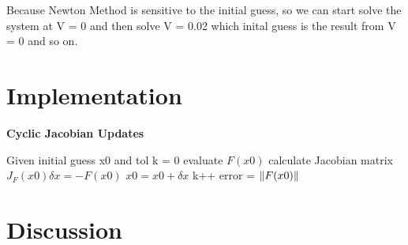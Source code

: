\documentclass{article}
\DeclarePairedDelimiter{\norm}{\lVert}{\rVert}
\begin{document}
Because Newton Method is sensitive to the initial guess, so we can start solve the system at V = 0 and then solve V = 0.02 which inital guess is
the result from V = 0 and so on.
\newpage

\section{Implementation}
\begin{algorithm}[H]
    \caption{\textbf{Cyclic Jacobian Updates}}
    \begin{algorithmic}
        \State Given initial guess x0 and tol
        \State k = 0
            \State evaluate $F(x0)$
                \State calculate Jacobian matrix
            \EndIf
            \State $J_F(x0)\delta{x} = -F(x0)$
            \State $x0 = x0 + \delta{x}$
            \State k++
            \State error = $\norm{F(x0)}$
        \EndWhile
    \end{algorithmic}
\end{algorithm}

\section{Discussion}
\end{document}
